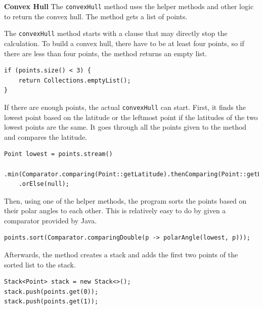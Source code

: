     \textbf{Convex Hull}
    The \texttt{convexHull} method uses the helper methods and other logic to return the convex hull. The method gets a list of points. \newline
    
    The \texttt{convexHull} method starts with a clause that may directly stop the calculation. To build a convex hull, there have to be at least four points, so if there are less than four points, the method returns an empty list.
    \lstset{style=mycsharp, caption=if Clause for Point Size}
    \begin{lstlisting}
if (points.size() < 3) {
    return Collections.emptyList();
}
    \end{lstlisting}
 
    If there are enough points, the actual \texttt{convexHull} can start. First, it finds the lowest point based on the latitude or the leftmost point if the latitudes of the two lowest points are the same. It goes through all the points given to the method and compares the latitude.
    \lstset{style=mycsharp, caption=Lowest Point Calculation}
    \begin{lstlisting}
Point lowest = points.stream()
    .min(Comparator.comparing(Point::getLatitude).thenComparing(Point::getLongitude))
    .orElse(null);
    \end{lstlisting}

    Then, using one of the helper methods, the program sorts the points based on their polar angles to each other. This is relatively easy to do by given a comparator provided by Java.

    \lstset{style=mycsharp, caption=Sort Points Based on Polar Angle}
    \begin{lstlisting}
points.sort(Comparator.comparingDouble(p -> polarAngle(lowest, p)));
    \end{lstlisting}

    Afterwards, the method creates a stack and adds the first two points of the sorted list to the stack. 
    \lstset{style=mycsharp, caption=Create Stack}
    \begin{lstlisting}
Stack<Point> stack = new Stack<>();
stack.push(points.get(0));
stack.push(points.get(1));
    \end{lstlisting}

